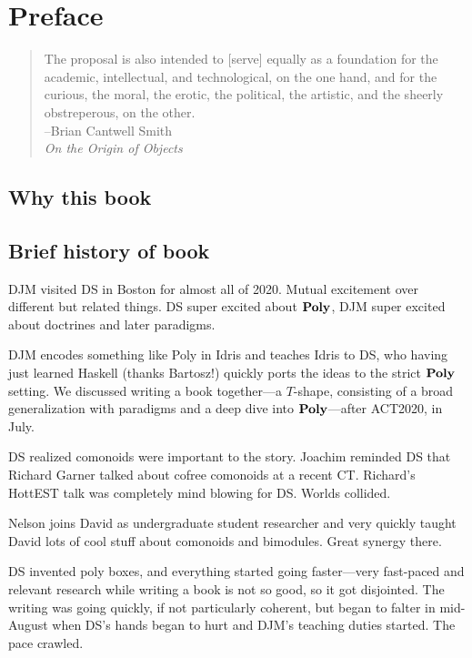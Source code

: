 \documentclass[Book-Poly]{subfiles}
\begin{document}
%


\setcounter{chapter}{-1}%


\chapter*{Preface}\label{chapter.0}

\begin{quote}
	The proposal is also intended to [serve] equally as a foundation for the academic, intellectual, and technological, on the one hand, and for the curious, the moral, the erotic, the political, the artistic, and the sheerly obstreperous, on the other.\\
\mbox{}\hfill --Brian Cantwell Smith\\
\mbox{}\hfill \emph{On the Origin of Objects}
\end{quote}


\section*{Why this book}

\section*{Brief history of book}

DJM visited DS in Boston for almost all of 2020. Mutual excitement over different but related things. DS super excited about $\textbf{Poly}$, DJM super excited about doctrines and later paradigms.

DJM encodes something like Poly in Idris and teaches Idris to DS, who having just learned Haskell (thanks Bartosz!) quickly ports the ideas to the strict $\textbf{Poly}$ setting. We discussed writing a book together---a $T$-shape, consisting of a broad generalization with paradigms and a deep dive into $\textbf{Poly}$---after ACT2020, in July.

DS realized comonoids were important to the story. Joachim reminded DS that Richard Garner talked about cofree comonoids at a recent CT. Richard's HottEST talk was completely mind blowing for DS. Worlds collided.

Nelson joins David as undergraduate student researcher and very quickly taught David lots of cool stuff about comonoids and bimodules. Great synergy there. 

DS invented poly boxes, and everything started going faster---very fast-paced and relevant research while writing a book is not so good, so it got disjointed. The writing was going quickly, if not particularly coherent, but began to falter in mid-August when DS's hands began to hurt and DJM's teaching duties started. The pace crawled. 
\end{document}
